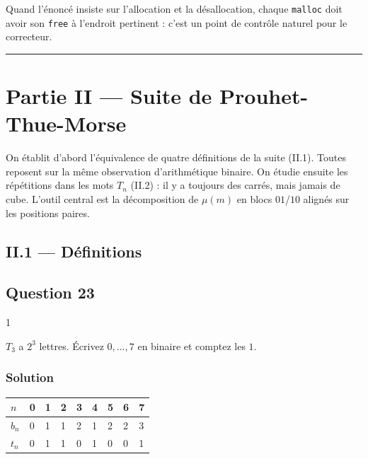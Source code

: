 \documentclass[11pt,a4paper]{article}
\begin{document}
\begin{jury}

Quand l'énoncé insiste sur l'allocation et la désallocation, chaque \texttt{malloc} doit avoir son \texttt{free} à l'endroit pertinent : c'est un point de contrôle naturel pour le correcteur.

\end{jury}

\begin{center}\rule{0.5\linewidth}{0.5pt}\end{center}

\hypertarget{partie-ii-suite-de-prouhet-thue-morse}{%
\section{Partie II --- Suite de Prouhet-Thue-Morse}\label{partie-ii-suite-de-prouhet-thue-morse}}

On établit d'abord l'équivalence de quatre définitions de la suite (II.1). Toutes reposent sur la même observation d'arithmétique binaire. On étudie ensuite les répétitions dans les mots \(T_n\) (II.2) : il y a toujours des carrés, mais jamais de cube. L'outil central est la décomposition de \(\mu(m)\) en blocs \(01\)/\(10\) alignés sur les positions paires.

\hypertarget{ii.1-duxe9finitions}{%
\subsection{II.1 --- Définitions}\label{ii.1-duxe9finitions}}

\hypertarget{question-23}{%
\subsection{Question 23}\label{question-23}}

\begin{indication}{1}

\(T_3\) a \(2^3\) lettres. Écrivez \(0,\dots,7\) en binaire et comptez les \(1\).

\end{indication}

\hypertarget{solution-22}{%
\subsubsection{Solution}\label{solution-22}}

\begin{longtable}[]{@{}lllllllll@{}}
\toprule\noalign{}
\(n\) & 0 & 1 & 2 & 3 & 4 & 5 & 6 & 7 \\
\midrule\noalign{}
\endhead
\bottomrule\noalign{}
\endlastfoot
\(b_n\) & 0 & 1 & 1 & 2 & 1 & 2 & 2 & 3 \\
\(t_n\) & 0 & 1 & 1 & 0 & 1 & 0 & 0 & 1 \\
\end{longtable}
\end{document}
